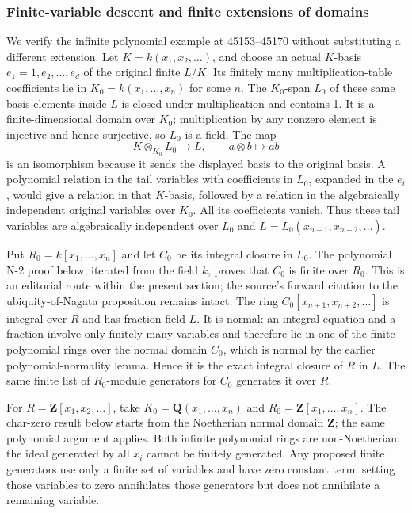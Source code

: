 \subsubsection{Finite-variable descent and finite extensions of domains}\label{finite-variable-descent-and-finite-extensions-of-domains}

We verify the infinite polynomial example at 45153--45170 without substituting a different extension. Let \(K=k(x_1,x_2,\ldots)\), and choose an actual \(K\)-basis \(e_1=1,e_2,\ldots,e_d\) of the original finite \(L/K\). Its finitely many multiplication-table coefficients lie in \(K_0=k(x_1,\ldots,x_n)\) for some \(n\). The \(K_0\)-span \(L_0\) of these same basis elements inside \(L\) is closed under multiplication and contains 1. It is a finite-dimensional domain over \(K_0\); multiplication by any nonzero element is injective and hence surjective, so \(L_0\) is a field. The map \[
 K\otimes_{K_0}L_0\longrightarrow L,\qquad a\otimes b\longmapsto ab
\] is an isomorphism because it sends the displayed basis to the original basis. A polynomial relation in the tail variables with coefficients in \(L_0\), expanded in the \(e_i\), would give a relation in that \(K\)-basis, followed by a relation in the algebraically independent original variables over \(K_0\). All its coefficients vanish. Thus these tail variables are algebraically independent over \(L_0\) and \(L=L_0(x_{n+1},x_{n+2},\ldots)\).

Put \(R_0=k[x_1,\ldots,x_n]\) and let \(C_0\) be its integral closure in \(L_0\). The polynomial N-2 proof below, iterated from the field \(k\), proves that \(C_0\) is finite over \(R_0\). This is an editorial route within the present section; the source's forward citation to the ubiquity-of-Nagata proposition remains intact. The ring \(C_0[x_{n+1},x_{n+2},\ldots]\) is integral over \(R\) and has fraction field \(L\). It is normal: an integral equation and a fraction involve only finitely many variables and therefore lie in one of the finite polynomial rings over the normal domain \(C_0\), which is normal by the earlier polynomial-normality lemma. Hence it is the exact integral closure of \(R\) in \(L\). The same finite list of \(R_0\)-module generators for \(C_0\) generates it over \(R\).

For \(R=\mathbf Z[x_1,x_2,\ldots]\), take \(K_0=\mathbf Q(x_1,\ldots,x_n)\) and \(R_0=\mathbf Z[x_1,\ldots,x_n]\). The char-zero result below starts from the Noetherian normal domain \(\mathbf Z\); the same polynomial argument applies. Both infinite polynomial rings are non-Noetherian: the ideal generated by all \(x_i\) cannot be finitely generated. Any proposed finite generators use only a finite set of variables and have zero constant term; setting those variables to zero annihilates those generators but does not annihilate a remaining variable.

